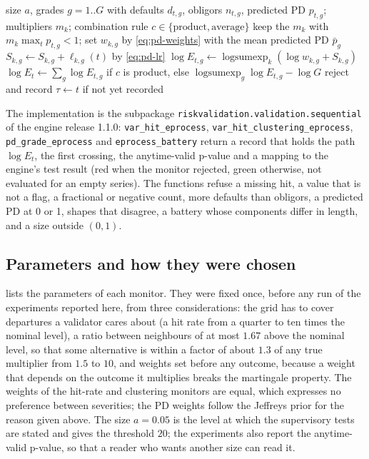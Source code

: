 \begin{algorithm}[htbp]
\caption{PD monitor of $G$ grades with a combination rule.}
\label{alg:pd}
\begin{algorithmic}[1]
\Require size $a$, grades $g=1..G$ with defaults $d_{t,g}$, obligors $n_{t,g}$, predicted PD $p_{t,g}$; multipliers $m_k$; combination rule $c\in\{\text{product},\text{average}\}$
  \State keep the $m_k$ with $m_k\max_tp_{t,g}<1$; set $w_{k,g}$ by \cref{eq:pd-weights} with the mean predicted PD $\bar p_g$
\EndFor
{}
    \State $S_{k,g}\gets S_{k,g}+\ell_{k,g}(t)$ by \cref{eq:pd-lr} 
    \State $\log E_{t,g}\gets\operatorname{logsumexp}_k(\log w_{k,g}+S_{k,g})$
  \EndFor
  \State $\log E_t\gets\sum_g\log E_{t,g}$ if $c$ is product, else $\operatorname{logsumexp}_g\log E_{t,g}-\log G$
   reject and record $\tau\gets t$ if not yet recorded \EndIf
\EndFor
\end{algorithmic}
\end{algorithm}

The implementation is the subpackage \texttt{riskvalidation.validation.sequential} of the engine release 1.1.0: \texttt{var\_hit\_eprocess}, \texttt{var\_hit\_clustering\_eprocess}, \texttt{pd\_grade\_eprocess} and \texttt{eprocess\_battery} return a record that holds the path $\log E_t$, the first crossing, the anytime-valid p-value and a
mapping to the engine's test result (red when the monitor rejected, green otherwise, not evaluated for an empty series). The functions refuse a missing hit, a value that is not a flag, a fractional or negative count, more defaults than obligors, a predicted PD at 0 or 1, shapes that disagree, a battery whose components differ in length, and a size outside $(0,1)$.

\subsection{Parameters and how they were chosen}
\label{sec:method-parameters}

 lists the parameters of each monitor. They were fixed once, before any run of the experiments reported here, from three considerations: the grid has to cover departures a validator cares about (a hit rate from a quarter to ten times the nominal level), a ratio between neighbours of at most $1.67$ above the nominal level, so that some alternative is within a factor of about $1.3$ of any true multiplier from $1.5$ to $10$, and weights set before any
outcome, because a weight that depends on the outcome it multiplies breaks the martingale property. The weights of the hit-rate and clustering monitors are equal, which expresses no preference between severities;
the PD weights follow the Jeffreys prior for the reason given above. The size $a=0.05$ is the level at which the supervisory tests are stated and gives the threshold $20$; the experiments also report the anytime-valid p-value, so that a reader who wants another size can read it.

